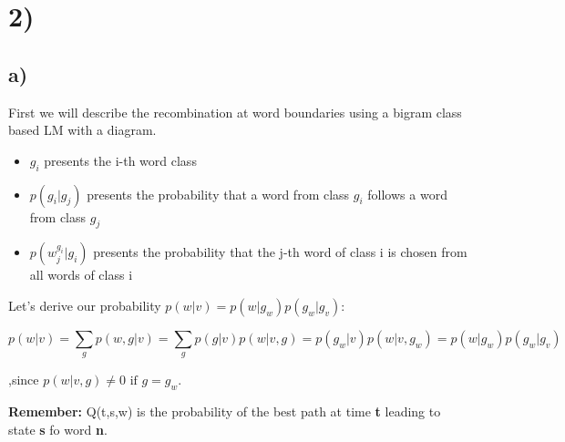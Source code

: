 \section*{2)} %
\label{sec:2_}

\subsection*{a)} %
\label{sub:a_}

First we will describe the recombination at word boundaries using a bigram class based LM with a diagram.

\begin{itemize}
	\item $g_i$ presents the i-th word class
	\item $p(g_i|g_j)$ presents the probability that a word from class $g_i$ follows a word from class $g_j$
	\item $p(w_{j}^{g_i}|g_i)$ presents the probability that the j-th word of class i is chosen from all words of class i
\end{itemize}

Let's derive our probability $p(w|v) = p(w|g_w)p(g_w|g_v)$:

\[
p(w|v) = \sum_g p(w,g|v) = \sum_g p(g|v)p(w|v,g) = p(g_w|v)p(w|v,g_w) = p(w|g_w)p(g_w|g_v)
\]

,since $p(w|v,g) \ne 0 \text{ if } g=g_w$.

\textbf{Remember:}
Q(t,s,w) is the probability of the best path at time \textbf{t} leading to 
state \textbf{s} fo word \textbf{n}.

